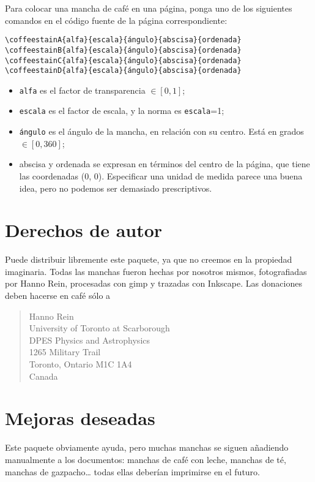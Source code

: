 \documentclass[a4paper, 11pt, BCOR = 0 pt, oneside]{scrartcl}
\begin{document}
Para colocar una mancha de café en una página, ponga uno de los siguientes comandos en el código fuente de la página correspondiente:
\begin{verbatim}
\coffeestainA{alfa}{escala}{ángulo}{abscisa}{ordenada}
\coffeestainB{alfa}{escala}{ángulo}{abscisa}{ordenada}
\coffeestainC{alfa}{escala}{ángulo}{abscisa}{ordenada}
\coffeestainD{alfa}{escala}{ángulo}{abscisa}{ordenada}
\end{verbatim}

\begin{itemize}
\item \texttt{alfa} es el factor de transparencia $\in [0,1]$;
\item \texttt{escala} es el factor de escala, y la norma es \texttt{escala}=1;
\item \texttt{ángulo} es el ángulo de la mancha, en relación con su centro. Está en grados $\in [0,360]$;
\item abscisa y ordenada se expresan en términos del centro de la página, que tiene las coordenadas (0, 0). Especificar una unidad de medida parece una buena idea, pero no podemos ser demasiado prescriptivos.
\end{itemize}


\section{Derechos de autor}
Puede distribuir libremente este paquete, ya que no creemos en la propiedad
imaginaria. Todas las manchas fueron hechas por nosotros mismos, fotografiadas
por Hanno Rein, procesadas con gimp y trazadas con Inkscape. Las donaciones
deben hacerse en café sólo a
\begin{quote}
Hanno Rein\\
University of Toronto at Scarborough\\
DPES Physics and Astrophysics\\
1265 Military Trail\\
Toronto, Ontario M1C 1A4\\
Canada
\end{quote}

\section{Mejoras deseadas}
Este paquete obviamente ayuda, pero muchas manchas se siguen añadiendo
manualmente a los documentos: manchas de café con leche, manchas de té, manchas
de gazpacho\dots{} todas ellas deberían imprimirse en el futuro.
\end{document}
